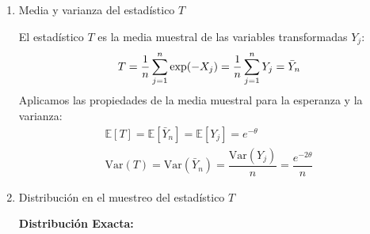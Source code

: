 \begin{enumerate}[label=\color{red}\textbf{\arabic*)}]
\begin{enumerate}[label=\arabic*)]
		            \textbf{Esperanza de $Y_j$:} \[
			            \mathbb{E}[Y_j]=\int_{0}^{\infty} ye^{\theta}\exp(-ye^{\theta} )\dy
		            \]
		            Cambio de variable $t=ye^{\theta}\implies \dt=e^{\theta}\dy$ y $y=\dfrac{t}{e^{\theta} }$: \[
			            \mathbb{E}[Y_j]=\int_{0}^{\infty} \dfrac{t}{e^{\theta} }e^{-t}\dt=\dfrac{1}{e^{\theta} }\Gamma(2)=e^{-\theta}
		            \]
		            \textbf{Esperanza de $Y_j^2$:} \[
			            \mathbb{E}[Y_j^2]=\int_{0}^{\infty} y^2e^{\theta}\exp(-ye^{\theta} )  \dy =\int_{0}^{\infty} \left( \dfrac{t}{e^{\theta} } \right)^2e^{-t}\dt=\dfrac{1}{e^{2\theta}}\Gamma(3)=2e^{-2\theta}
		            \]
		            \textbf{Varianza de $Y_j$:} \[
			            \mathrm{Var}(Y_j)=\mathbb{E}[Y_j^2]-(\mathbb{E}[Y_j])^2=2e^{-2\theta}-(e^{-\theta})^2=e^{-2\theta}
		            \]
		      \item Media y varianza del estadístico $T$

		            El estadístico  $T$ es la media muestral de las variables transformadas  $Y_j$:  \[
			            T=\dfrac{1}{n}\sum_{j=1}^{n} \exp(-X_j)=\dfrac{1}{n}\sum_{j=1}^{n} Y_j=\bar{Y}_n\\
		            \]
		            Aplicamos las propiedades de la media muestral para la esperanza y la varianza: \[
			            \begin{array}{c}
				            \mathbb{E}[T]=\mathbb{E}[\bar{Y}_n]=\mathbb{E}[Y_j]=e^{-\theta} \\
				            \mathrm{Var}(T)=\mathrm{Var}(\bar{Y}_n)=\dfrac{\mathrm{Var}(Y_j)}{n}=\dfrac{e^{-2\theta}}{n}
			            \end{array}
		            \]
		      \item Distribución en el muestreo del estadístico $T$

		            \textbf{Distribución Exacta:}


\end{enumerate}
\end{enumerate}
